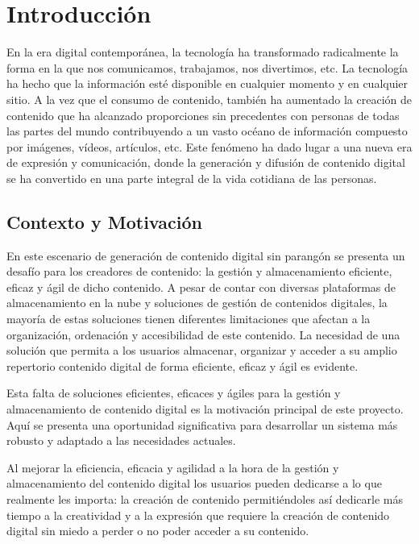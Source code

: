 \chapter{Introducción}

En la era digital contemporánea, la tecnología ha transformado radicalmente la forma en la que nos comunicamos, trabajamos, nos divertimos, etc. 
La tecnología ha hecho que la información esté disponible en cualquier momento y en cualquier sitio. A la vez que el consumo de contenido,
también ha aumentado la creación de contenido que ha alcanzado proporciones sin precedentes con personas de todas las partes del mundo contribuyendo a un vasto
océano de información compuesto por imágenes, vídeos, artículos, etc. Este fenómeno ha dado lugar a una nueva era de expresión y comunicación, donde la
generación y difusión de contenido digital se ha convertido en una parte integral de la vida cotidiana de las personas.

\section{Contexto y Motivación}

En este escenario de generación de contenido digital sin parangón se presenta un desafío para los creadores de contenido: la gestión y almacenamiento eficiente, eficaz
y ágil de dicho contenido. A pesar de contar con diversas plataformas de almacenamiento en la nube y soluciones de gestión de contenidos digitales, la mayoría de
estas soluciones tienen diferentes limitaciones que afectan a la organización, ordenación y accesibilidad de este contenido. La necesidad de una solución que permita
a los usuarios almacenar, organizar y acceder a su amplio repertorio contenido digital de forma eficiente, eficaz y ágil es evidente.

Esta falta de soluciones eficientes, eficaces y ágiles para la gestión y almacenamiento de contenido digital es la motivación principal de este proyecto. Aquí se
presenta una oportunidad significativa para desarrollar un sistema más robusto y adaptado a las necesidades actuales.

Al mejorar la eficiencia, eficacia y agilidad a la hora de la gestión y almacenamiento del contenido digital los usuarios pueden dedicarse a lo que realmente les importa:
la creación de contenido permitiéndoles así dedicarle más tiempo a la creatividad y a la expresión que requiere la creación de contenido digital sin miedo a perder o
no poder acceder a su contenido.

